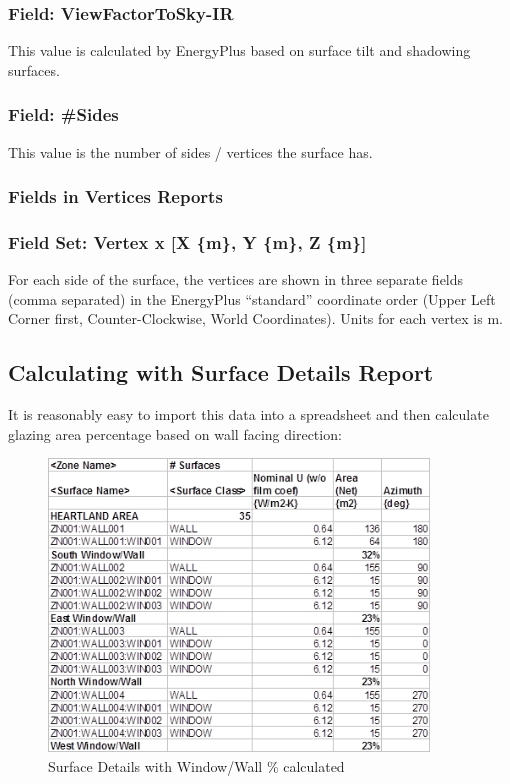 \subsubsection{Field: ViewFactorToSky-IR}\label{field-viewfactortosky-ir}

This value is calculated by EnergyPlus based on surface tilt and shadowing surfaces.

\subsubsection{Field: \#Sides}\label{field-sides}

This value is the number of sides / vertices the surface has.

\subsubsection{Fields in Vertices Reports}\label{fields-in-vertices-reports}

\subsubsection{Field Set: Vertex x {[}X \{m\}, Y \{m\}, Z \{m\}{]}}\label{field-set-vertex-x-x-m-y-m-z-m}

For each side of the surface, the vertices are shown in three separate fields (comma separated) in the EnergyPlus ``standard'' coordinate order (Upper Left Corner first, Counter-Clockwise, World Coordinates). Units for each vertex is m.

\subsection{Calculating with Surface Details Report}\label{calculating-with-surface-details-report}

It is reasonably easy to import this data into a spreadsheet and then calculate glazing area percentage based on wall facing direction:

\begin{figure}[hbtp] %
\centering
\includegraphics[width=0.9\textwidth, height=0.9\textheight, keepaspectratio=true]{media/image012.png}
\caption{Surface Details with Window/Wall \% calculated \protect \label{fig:surface-details-with-windowwall-calculated}}
\end{figure}

